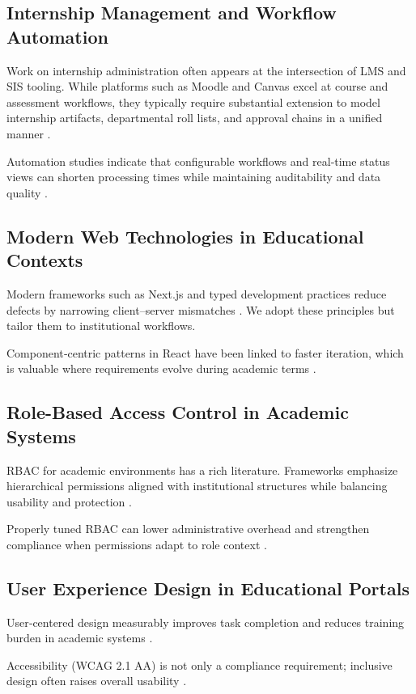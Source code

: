 \documentclass[conference]{IEEEtran}
\begin{document}
\subsection{Internship Management and Workflow Automation}
Work on internship administration often appears at the intersection of LMS and SIS tooling. While platforms such as Moodle and Canvas excel at course and assessment workflows, they typically require substantial extension to model internship artifacts, departmental roll lists, and approval chains in a unified manner \cite{moodle2023, canvas2023}.

Automation studies indicate that configurable workflows and real‑time status views can shorten processing times while maintaining auditability and data quality \cite{anderson2023workflow}.

\subsection{Modern Web Technologies in Educational Contexts}
Modern frameworks such as Next.js and typed development practices reduce defects by narrowing client–server mismatches \cite{nextjs2024, typescript2024}. We adopt these principles but tailor them to institutional workflows.

Component‑centric patterns in React have been linked to faster iteration, which is valuable where requirements evolve during academic terms \cite{martinez2023modern}.

\subsection{Role-Based Access Control in Academic Systems}
RBAC for academic environments has a rich literature. Frameworks emphasize hierarchical permissions aligned with institutional structures while balancing usability and protection \cite{kumar2022rbac}.

Properly tuned RBAC can lower administrative overhead and strengthen compliance when permissions adapt to role context \cite{patel2023academic}.

\subsection{User Experience Design in Educational Portals}
User‑centered design measurably improves task completion and reduces training burden in academic systems \cite{garcia2023ux}.

Accessibility (WCAG 2.1 AA) is not only a compliance requirement; inclusive design often raises overall usability \cite{wilson2023accessibility}.
\end{document}
